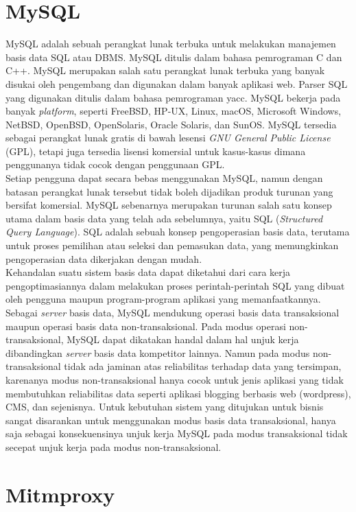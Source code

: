 \section{MySQL}
MySQL adalah sebuah perangkat lunak terbuka untuk melakukan manajemen basis data SQL atau DBMS. MySQL ditulis dalam bahasa pemrograman C dan C++. MySQL merupakan salah satu perangkat lunak terbuka yang banyak disukai oleh pengembang dan digunakan dalam banyak aplikasi web. Parser SQL yang digunakan ditulis dalam bahasa pemrograman yacc. MySQL bekerja pada banyak \textit{platform}, seperti  FreeBSD, HP-UX, Linux, macOS, Microsoft Windows, NetBSD, OpenBSD, OpenSolaris, Oracle Solaris, dan SunOS. MySQL tersedia sebagai perangkat lunak gratis di bawah lesensi \textit{GNU General Public License} (GPL), tetapi juga tersedia lisensi komersial untuk kasus-kasus dimana penggunanya tidak cocok dengan penggunaan GPL. \cite{bab2-mysql}\\
\indent Setiap pengguna dapat secara bebas menggunakan MySQL, namun dengan batasan perangkat lunak tersebut tidak boleh dijadikan produk turunan yang bersifat komersial. MySQL sebenarnya merupakan turunan salah satu konsep utama dalam basis data yang telah ada sebelumnya, yaitu SQL (\textit{Structured Query Language}). SQL adalah sebuah konsep pengoperasian basis data, terutama untuk proses pemilihan atau seleksi dan pemasukan data, yang memungkinkan pengoperasian data dikerjakan dengan mudah.\\
\indent Kehandalan suatu sistem basis data dapat diketahui dari cara kerja pengoptimasiannya dalam melakukan proses perintah-perintah SQL yang dibuat oleh pengguna maupun program-program aplikasi yang memanfaatkannya. Sebagai \textit{server} basis data, MySQL mendukung operasi basis data transaksional maupun operasi basis data non-transaksional. Pada modus operasi non-transaksional, MySQL dapat dikatakan handal dalam hal unjuk kerja dibandingkan \textit{server} basis data kompetitor lainnya. Namun pada modus non-transaksional tidak ada jaminan atas reliabilitas terhadap data yang tersimpan, karenanya modus non-transaksional hanya cocok untuk jenis aplikasi yang tidak membutuhkan reliabilitas data seperti aplikasi blogging berbasis web (wordpress), CMS, dan sejenisnya. Untuk kebutuhan sistem yang ditujukan untuk bisnis sangat disarankan untuk menggunakan modus basis data transaksional, hanya saja sebagai konsekuensinya unjuk kerja MySQL pada modus transaksional tidak secepat unjuk kerja pada modus non-transaksional.

\section{Mitmproxy}

